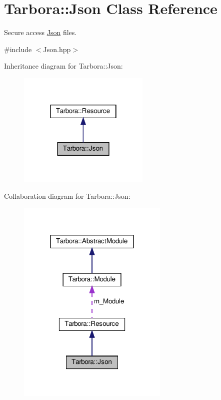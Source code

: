 \hypertarget{classTarbora_1_1Json}{}\section{Tarbora\+:\+:Json Class Reference}
\label{classTarbora_1_1Json}


Secure access \hyperlink{classTarbora_1_1Json}{Json} files.  




{\ttfamily \#include $<$Json.\+hpp$>$}



Inheritance diagram for Tarbora\+:\+:Json\+:\nopagebreak
\begin{figure}[H]
\begin{center}
\leavevmode
\includegraphics[width=178pt]{classTarbora_1_1Json__inherit__graph}
\end{center}
\end{figure}


Collaboration diagram for Tarbora\+:\+:Json\+:
\nopagebreak
\begin{figure}[H]
\begin{center}
\leavevmode
\includegraphics[width=204pt]{classTarbora_1_1Json__coll__graph}
\end{center}
\end{figure}

